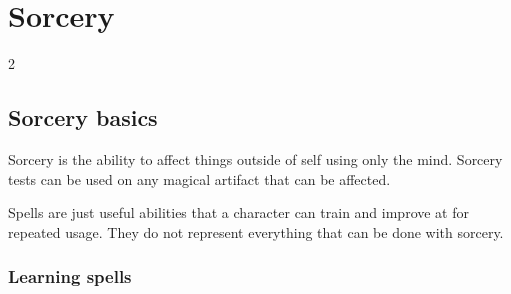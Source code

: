 \chapter{Sorcery}

\begin{multicols}{2}

\newcommand{\spell}[2]{%
  \pgfkeys{/spell/.cd, cost=, knowledge=, requirements=, dl=, type=,
    cast range=, cast area=, effect range=, effect area=,
    duration=, damage=, test=, miss=, graze=, hit=, crit=, enhance=, effect=, #2}%
  \statrule
  {\sffamily\bfseries\large #1} \\
  \statrow{Cost:}{\spellCost}
  \statrow{Knowledge:}{\spellKnowledge}
  \statrow{Requirements:}{\spellReq}
  \statrow{DL:}{\spellDL}
  \statrow{Type:}{\spellType}
  \statrow{Cast range:}{\spellCastRange}
  \statrow{Cast area:}{\spellCastArea}
  \statrow{Effect range:}{\spellEffectRange}
  \statrow{Effect area:}{\spellEffectArea}
  \statrow{Duration:}{\spellDuration}
  \statrow{Damage:}{\spellDamage}
  \statrow{Test:}{\spellTest}
  \statrow{Effect:}{\spellEffect}
  \statrow{Miss:}{\spellMiss}
  \statrow{Graze:}{\spellGraze}
  \statrow{Hit:}{\spellHit}
  \statrow{Crit:}{\spellCrit}
  \statrow{Enhance:}{\spellEnhance}
}

\section{Sorcery basics}

Sorcery is the ability to affect things outside of self using only the mind. Sorcery tests can be used on any magical artifact that can be affected. 

Spells are just useful abilities that a character can train and improve at for repeated usage. They do not represent everything that can be done with sorcery.

\subsection{Learning spells}


\end{multicols}
